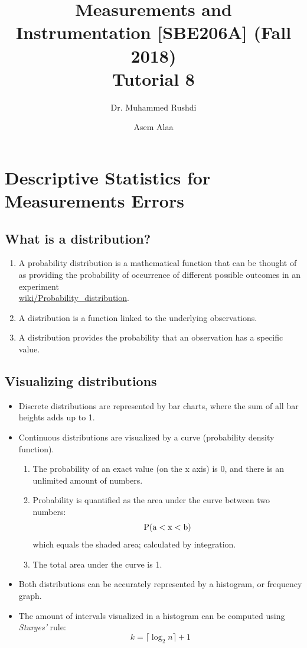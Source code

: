 \documentclass[a4paper,11pt,dvipsnames]{book}
\begin{document}
\author{Dr. Muhammed Rushdi \and Asem Alaa}

\title{Measurements and Instrumentation [SBE206A] (Fall 2018)\\ Tutorial 8}

\maketitle


\chapter*{Descriptive Statistics for Measurements Errors}

\twocolumn

\section*{What is a distribution?}
\begin{enumerate}
\item A probability distribution is a mathematical function that can be thought of as providing the probability of occurrence of different possible outcomes in an experiment\\ \href{https://en.wikipedia.org/wiki/Probability_distribution}{wiki/Probability\_distribution}.
\item A distribution is a function linked to the underlying observations.
\item A distribution provides the probability that an observation has a specific value.
\end{enumerate}

\section*{Visualizing distributions}

\begin{itemize}
\item Discrete distributions are represented by bar charts, where the sum of all bar heights adds up to 1.
\item Continuous distributions are visualized by a curve (probability density function). 
\begin{enumerate}
\item The probability of an exact value (on the x axis) is 0, and there is an unlimited amount of numbers. 
\item Probability is quantified as the area under the curve between two numbers: $$\rm P(a < x < b) $$
which equals the shaded area; calculated by integration.
\item The total area under the curve is 1.
\end{enumerate}
\item Both distributions can be accurately represented by a histogram, or frequency graph.
\item The amount of intervals visualized in a histogram can be computed using \emph{Sturges'} rule:
\begin{equation}
k = \lceil \log_2 n \rceil+ 1
\end{equation}
\end{itemize}
\end{document}
